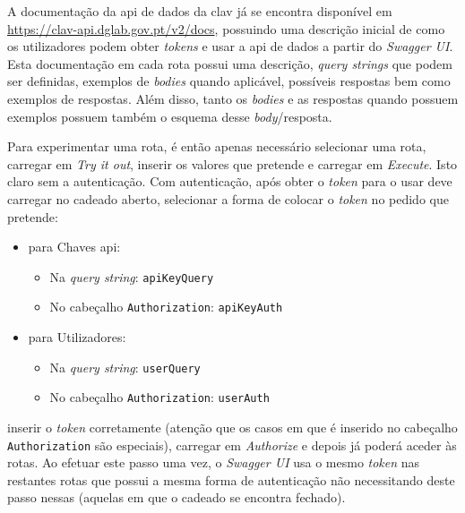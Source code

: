 A documentação da \acrshort{api} de dados da \acrshort{clav} já se encontra disponível em \url{https://clav-api.dglab.gov.pt/v2/docs}, possuindo uma descrição inicial de como os utilizadores podem obter \textit{tokens} e usar a \acrshort{api} de dados a partir do \textit{Swagger UI}. Esta documentação em cada rota possui uma descrição, \textit{query strings} que podem ser definidas, exemplos de \textit{bodies} quando aplicável, possíveis respostas bem como exemplos de respostas. Além disso, tanto os \textit{bodies} e as respostas quando possuem exemplos possuem também o esquema desse \textit{body}/resposta.

Para experimentar uma rota, é então apenas necessário selecionar uma rota, carregar em \textit{Try it out}, inserir os valores que pretende e carregar em \textit{Execute}. Isto claro sem a autenticação. Com autenticação, após obter o \textit{token} para o usar deve carregar no cadeado aberto, selecionar a forma de colocar o \textit{token} no pedido que pretende: 
\begin{itemize}
    \item para Chaves \acrshort{api}:
    \begin{itemize}
        \item Na \textit{query string}: \texttt{apiKeyQuery}
        \item No cabeçalho \texttt{Authorization}: \texttt{apiKeyAuth}
    \end{itemize}
    \item para Utilizadores:
    \begin{itemize}
        \item Na \textit{query string}: \texttt{userQuery}
        \item No cabeçalho \texttt{Authorization}: \texttt{userAuth}
    \end{itemize}
\end{itemize}
inserir o \textit{token} corretamente (atenção que os casos em que é inserido no cabeçalho \texttt{Authorization} são especiais), carregar em \textit{Authorize} e depois já poderá aceder às rotas. Ao efetuar este passo uma vez, o \textit{Swagger UI} usa o mesmo \textit{token} nas restantes rotas que possui a mesma forma de autenticação não necessitando deste passo nessas (aquelas em que o cadeado se encontra fechado).
